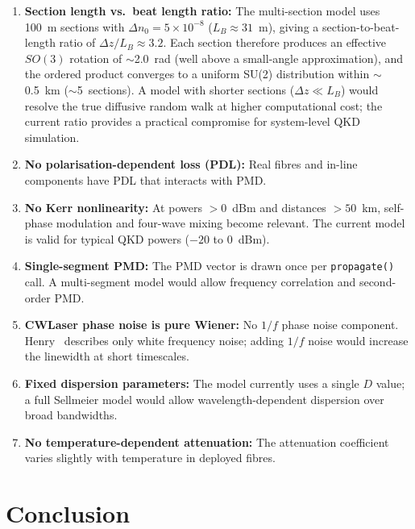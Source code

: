 \documentclass[3p,times,preprint]{elsarticle}
\begin{document}
\begin{enumerate}[nosep]
  \item \textbf{Section length vs.\ beat length ratio:} The multi-section
    model uses 100~m sections with $\Delta n_0 = 5\times10^{-8}$
    ($L_B \approx 31$~m), giving a section-to-beat-length ratio of
    $\Delta z / L_B \approx 3.2$.  Each section therefore produces an
    effective $SO(3)$ rotation of $\sim$2.0~rad (well above a small-angle
    approximation), and the ordered product converges to a uniform SU(2)
    distribution within $\sim$0.5~km ($\sim$5~sections).  A model with
    shorter sections ($\Delta z \ll L_B$) would resolve the true
    diffusive random walk at higher computational cost; the current ratio
    provides a practical compromise for system-level QKD simulation.

  \item \textbf{No polarisation-dependent loss (PDL):} Real fibres and
    in-line components have PDL that interacts with PMD.

  \item \textbf{No Kerr nonlinearity:} At powers $>0$~dBm and
    distances $>50$~km, self-phase modulation and four-wave mixing
    become relevant.  The current model is valid for typical QKD
    powers ($-20$ to $0$~dBm).

  \item \textbf{Single-segment PMD:} The PMD vector is drawn once per
    \texttt{propagate()} call.  A multi-segment model would allow frequency
    correlation and second-order PMD.

  \item \textbf{CWLaser phase noise is pure Wiener:} No $1/f$ phase noise
    component.  Henry~\cite{henry} describes only white frequency noise;
    adding $1/f$ noise would increase the linewidth at short timescales.

  \item \textbf{Fixed dispersion parameters:} The model currently uses
    a single $D$ value; a full Sellmeier model would allow
    wavelength-dependent dispersion over broad bandwidths.

  \item \textbf{No temperature-dependent attenuation:} The attenuation
    coefficient varies slightly with temperature in deployed fibres.
\end{enumerate}

\section{Conclusion}
\end{document}
